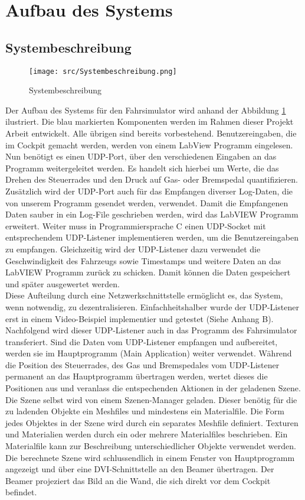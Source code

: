 \section{Aufbau des Systems}
\subsection{Systembeschreibung}
\begin{figure}[H]
\centering 
\texttt{[image: src/Systembeschreibung.png]}
\caption{Systembeschreibung} %
\label{Systembeschreibung} %
\end{figure}


Der Aufbau des Systems für den Fahrsimulator wird anhand der Abbildung \ref{Systembeschreibung} ilustriert. Die blau markierten Komponenten werden im Rahmen dieser Projekt Arbeit entwickelt. Alle übrigen sind bereits vorbestehend. 
Benutzereingaben, die im Cockpit gemacht werden, werden von einem LabView Programm eingelesen. Nun benötigt es einen UDP-Port,  über den verschiedenen Eingaben an das Programm weitergeleitet werden. Es handelt sich hierbei um Werte, die das Drehen des Steuerrades und den Druck auf Gas- oder Bremspedal quantifizieren. Zusätzlich wird der UDP-Port auch für das Empfangen diverser Log-Daten, die von unserem Programm gesendet werden, verwendet. Damit die Empfangenen Daten sauber in ein Log-File geschrieben werden, wird das LabVIEW Programm erweitert. 
Weiter  muss in Programmiersprache C einen UDP-Socket mit entsprechendem UDP-Listener implementieren werden, um die Benutzereingaben zu empfangen. Gleichzeitig wird der UDP-Listener dazu verwendet die Geschwindigkeit des Fahrzeugs sowie Timestamps und weitere Daten an das LabVIEW Programm zurück zu schicken. Damit können die Daten gespeichert und später ausgewertet werden.
\\
Diese Aufteilung durch eine Netzwerkschnittstelle ermöglicht es,  das System, wenn notwendig, zu dezentralisieren. Einfachheitshalber wurde der UDP-Listener erst in einem Video-Beispiel implementier und getestet (Siehe Anhang B). Nachfolgend wird dieser UDP-Listener auch in das Programm des Fahrsimulator transferiert.
Sind die Daten vom UDP-Listener empfangen und aufbereitet, werden sie im Hauptprogramm (Main Application) weiter verwendet. Während die Position des Steuerrades, des Gas und Bremspedales vom UDP-Listener permanent an das Hauptprogramm übertragen werden, wertet dieses die Positionen aus und veranlass die entspechenden Aktionen in der geladenen Szene. 
Die Szene selbst wird von einem Szenen-Manager geladen. Dieser benötig für die zu ladenden Objekte ein Meshfiles und mindestens ein Materialfile. Die Form jedes Objektes in der Szene wird durch ein separates Meshfile definiert. Texturen und Materialien werden durch ein oder mehrere Materialfiles beschrieben. Ein Materialfile kann zur Beschreibung unterschiedlicher Objekte verwendet werden. Die berechnete Szene wird schlussendlich in einem Fenster von Hauptprogramm angezeigt und über eine DVI-Schnittstelle an den Beamer übertragen. Der Beamer projeziert das Bild an die Wand, die sich direkt vor dem Cockpit befindet. 

